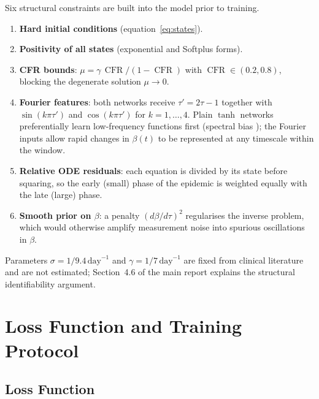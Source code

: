 \documentclass[11pt,a4paper]{article}
\theoremstyle{remark}
\begin{document}
Six structural constraints are built into the model prior to training.
\begin{enumerate}
    \item \textbf{Hard initial conditions} (equation~\eqref{eq:states}).
    \item \textbf{Positivity of all states} (exponential and Softplus forms).
    \item \textbf{CFR bounds}: $\mu = \gamma\,\operatorname{CFR}/(1-\operatorname{CFR})$ with
          $\operatorname{CFR}\in(0.2,0.8)$, blocking the degenerate solution $\mu\to 0$.
    \item \textbf{Fourier features}: both networks receive $\tau' = 2\tau-1$
          together with $\sin(k\pi\tau')$ and $\cos(k\pi\tau')$ for
          $k=1,\ldots,4$.  Plain $\tanh$ networks preferentially learn
          low-frequency functions first (spectral bias \cite{rahaman2019spectral});
          the Fourier inputs allow rapid changes in $\beta(t)$ to be
          represented at any timescale within the window.
    \item \textbf{Relative ODE residuals}: each equation is divided by its
          state before squaring, so the early (small) phase of the epidemic
          is weighted equally with the late (large) phase.
    \item \textbf{Smooth prior on $\beta$}: a penalty $(d\beta/d\tau)^2$
          regularises the inverse problem, which would otherwise amplify
          measurement noise into spurious oscillations in $\beta$.
\end{enumerate}
Parameters $\sigma = 1/9.4\,\text{day}^{-1}$ and $\gamma = 1/7\,\text{day}^{-1}$
are fixed from clinical literature and are not estimated; Section~4.6 of the
main report explains the structural identifiability argument.

\section{Loss Function and Training Protocol}
\label{sec:loss}

\subsection{Loss Function}
\end{document}
